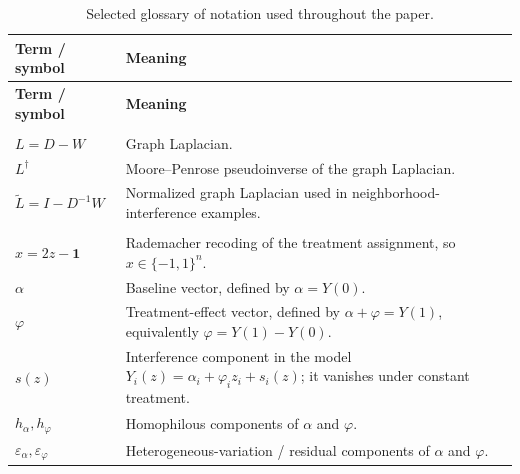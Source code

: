 \documentclass[12pt]{article}
\theoremstyle{definition}
\numberwithin{equation}{section}
\numberwithin{figure}{section}
\numberwithin{equation}{section}
\numberwithin{figure}{section}
\begin{document}
\clearpage




\begin{center}
\small
\setlength{\LTleft}{0pt}
\setlength{\LTright}{0pt}
\renewcommand{\arraystretch}{1.15}

\begin{longtable}{L{0.24\textwidth}L{0.71\textwidth}}
\caption{Selected glossary of notation used throughout the paper.}
\label{tab:glossary}\\
\toprule
\textbf{Term / symbol} & \textbf{Meaning} \\
\midrule
\endfirsthead

\toprule
\textbf{Term / symbol} & \textbf{Meaning} \\
\midrule
\endhead

\bottomrule
\endfoot

\\

$L=D-W$ & Graph Laplacian.\\
$L^\dagger$ & Moore--Penrose pseudoinverse of the graph Laplacian.\\
$\widetilde L = I-D^{-1}W$ & Normalized graph Laplacian used in neighborhood-interference examples.\\


\addlinespace
{}\\
$x=2z-\mathbf 1$ & Rademacher recoding of the treatment assignment, so $x\in\{-1,1\}^n$.\\
$\alpha$ & Baseline vector, defined by $\alpha=Y(0)$.\\
$\varphi$ & Treatment-effect vector, defined by $\alpha+\varphi=Y(1)$, equivalently $\varphi=Y(1)-Y(0)$.\\
$s(z)$ & Interference component in the model $Y_i(z)=\alpha_i+\varphi_i z_i+s_i(z)$; it vanishes under constant treatment.\\
$h_\alpha,h_\varphi$ & Homophilous components of $\alpha$ and $\varphi$.\\
$\varepsilon_\alpha,\varepsilon_\varphi$ & Heterogeneous-variation / residual components of $\alpha$ and $\varphi$.\\


\end{longtable}
\end{center}
\end{document}
